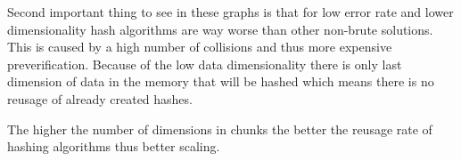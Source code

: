 Second important thing to see in these graphs is that for low error rate and lower dimensionality hash algorithms are way worse than other non-brute solutions. This is caused by a high number of collisions and thus more expensive preverification. Because of the low data dimensionality there is only last dimension of data in the memory that will be hashed which means there is no reusage of already created hashes.

The higher the number of dimensions in chunks the better the reusage rate of hashing algorithms thus better scaling.

\begin{figure}
\begin{minipage}{.5\linewidth}
\centering
{}
\end{minipage}%
\begin{minipage}{.5\linewidth}
\centering
{}
\end{minipage}\par\medskip


\end{figure}
